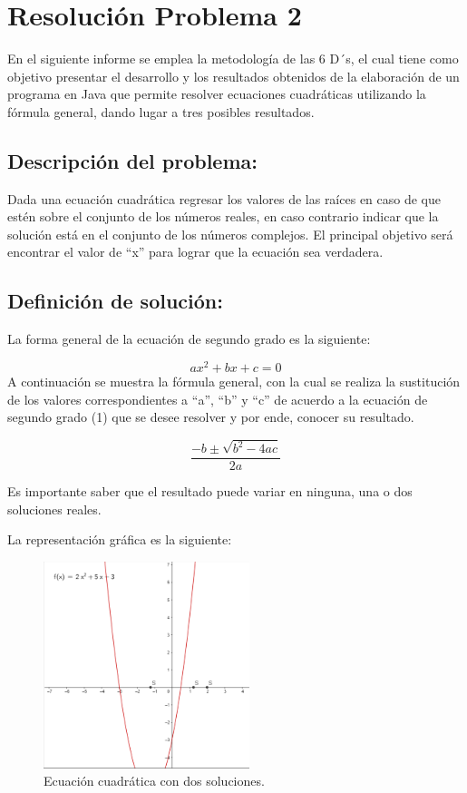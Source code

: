 \section{Resolución Problema 2} 
En el siguiente informe se emplea la metodología de las 6 D´s, el cual tiene como objetivo presentar el desarrollo y los resultados obtenidos de la elaboración de un programa en Java que permite resolver ecuaciones cuadráticas utilizando la fórmula general, dando lugar a tres posibles resultados.
\subsection{\textbf{Descripción del problema:}}
Dada una ecuación cuadrática regresar los valores de las raíces en caso de que estén sobre el conjunto de los números reales, en caso contrario indicar que la solución está en el conjunto de los números complejos. El principal objetivo será encontrar el valor de “x” para lograr que la ecuación sea verdadera.
\subsection{\textbf{Definición de solución:}}
La forma general de la ecuación de segundo grado es la siguiente:

\begin{equation}
    ax^{2}+bx+c=0  
    \label{eqn:ecuacioncuadratica}
\end{equation}
A continuación se muestra la fórmula general, con la cual se realiza la sustitución de los valores correspondientes a “a”, “b” y “c” de acuerdo a la ecuación de segundo grado (1) que se desee resolver y por ende, conocer su resultado.

\begin{equation}
    \frac{-b\pm\sqrt{b^2-4ac}}{2a}
\end{equation}

Es importante saber que el resultado puede variar en ninguna, una o dos soluciones reales.

La representación gráfica es la siguiente:

\begin{figure}[!ht]
\centering
\includegraphics[width=6cm]{LaTeX/latex-imagenes/ejemploGrafica.png}
\caption{Ecuación cuadrática con dos soluciones.}
\label{fig:grafica}
\end{figure}

